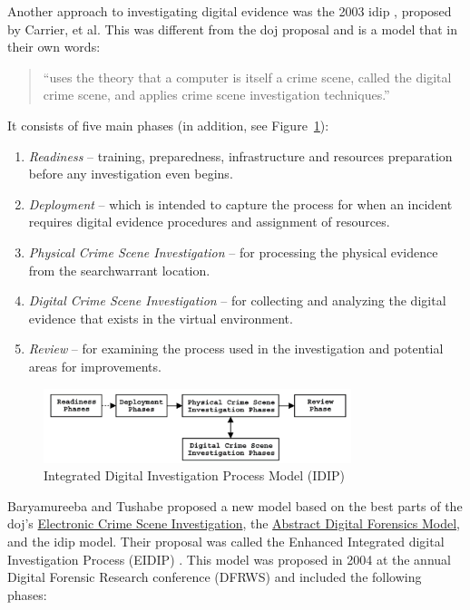 \documentclass[12pt]{article}
\begin{document}
Another approach to investigating digital evidence was the 2003
\gls{idip} \cite{carrier2003getting},
proposed by Carrier, et al.  This was different from the \gls{doj} proposal and
is a model that in their own words:
\begin{quote}
``uses the theory that a computer is itself a crime scene,
called the digital crime scene, and applies crime scene
investigation techniques.''
\end{quote}
It consists of five main phases (in addition, see Figure~\ref{fig:IDIP}):

\vspace{0.5 cm}
\begin{enumerate}
  \item {\em Readiness} -- training, preparedness, infrastructure and resources
  preparation before any investigation even begins.
  \item {\em Deployment} -- which is intended to capture the process for when an 
  incident requires digital evidence procedures and assignment of resources.
  \item {\em Physical Crime Scene Investigation} -- for processing the physical
  evidence from the \gls{searchwarrant} location.
  \item {\em Digital Crime Scene Investigation} -- for collecting and
  analyzing the digital evidence that exists in the virtual environment.
  \item {\em Review} -- for examining the process used in the investigation and
  potential areas for improvements. 
\end{enumerate}
\vspace{0.5 cm}

\begin{figure}[H]
  \centering
    \includegraphics[width=0.8\textwidth]{images/IDIP.png}
  \caption{Integrated Digital Investigation Process Model (IDIP)}
  \label{fig:IDIP}
\end{figure}

Baryamureeba and Tushabe proposed a new model 
based on the best parts of the \gls{doj}'s \uline{Electronic Crime
Scene Investigation}, the \uline{Abstract Digital Forensics Model}, and 
the \gls{idip} model.  Their proposal was called the
Enhanced Integrated digital Investigation Process (EIDIP) \cite{baryamureeba2004enhanced}.
This model was proposed in 2004 at the annual Digital Forensic Research conference
(DFRWS) \cite{baryamureeba2004enhanced} and included the following phases:
\end{document}
